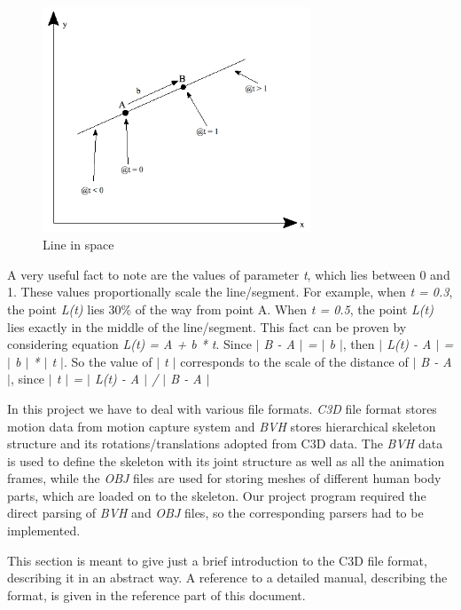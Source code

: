 \documentclass[times, 10pt,twocolumn]{article}
\begin{document}
\begin{figure}[H]
  \caption{Line in space}
  \label{line_in_space}
  \centering
  \includegraphics[width=80mm]{images/lines3d.jpg}
\end{figure}

A very useful fact to note are the values of parameter \emph{t}, which lies between 0 and 1. These values proportionally scale the line/segment. For example, when \emph{t = 0.3}, the point \emph{L(t)} lies 30\% of the way from point A. When \emph{t = 0.5}, the point \emph{L(t)} lies exactly in the middle of the line/segment. This fact can be proven by considering equation \emph{L(t) = A + b * t}. Since \emph{$|$ B - A $|$ = $|$ b $|$}, then \emph{$|$ L(t) - A $|$ = $|$ b $|$ * $|$ t $|$}. So the value of \emph{$|$ t $|$} corresponds to the scale of the distance of \emph{$|$ B - A $|$}, since \emph{$|$ t $|$ = $|$ L(t) - A $|$ / $|$ B - A $|$}


\label{data_formats}
In this project we have to deal with various file formats. \emph{C3D} file format stores motion data from motion capture system and \emph{BVH} stores hierarchical skeleton structure and its rotations/translations adopted from C3D data. The \emph{BVH} data is used to define the skeleton with its joint structure as well as all the animation frames, while the \emph{OBJ} files are used for storing meshes of different human body parts, which are loaded on to the skeleton. Our project program required the direct parsing of \emph{BVH} and \emph{OBJ} files, so the corresponding parsers had to be implemented.


This section is meant to give just a brief introduction to the C3D file format, describing it in an abstract way. A reference to a detailed manual, describing the format, is given in the reference part of this document.
\end{document}
